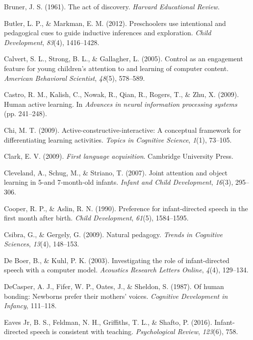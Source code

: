 \documentclass[a4paper,man,apacite,floatsintext]{apa6}
\begin{document}
\hypertarget{ref-bruner1961act}{}
Bruner, J. S. (1961). The act of discovery. \emph{Harvard Educational
Review}.

\hypertarget{ref-butler2012preschoolers}{}
Butler, L. P., \& Markman, E. M. (2012). Preschoolers use intentional
and pedagogical cues to guide inductive inferences and exploration.
\emph{Child Development}, \emph{83}(4), 1416--1428.

\hypertarget{ref-calvert2005control}{}
Calvert, S. L., Strong, B. L., \& Gallagher, L. (2005). Control as an
engagement feature for young children's attention to and learning of
computer content. \emph{American Behavioral Scientist}, \emph{48}(5),
578--589.

\hypertarget{ref-castro2009human}{}
Castro, R. M., Kalish, C., Nowak, R., Qian, R., Rogers, T., \& Zhu, X.
(2009). Human active learning. In \emph{Advances in neural information
processing systems} (pp. 241--248).

\hypertarget{ref-chi2009active}{}
Chi, M. T. (2009). Active-constructive-interactive: A conceptual
framework for differentiating learning activities. \emph{Topics in
Cognitive Science}, \emph{1}(1), 73--105.

\hypertarget{ref-clark2009first}{}
Clark, E. V. (2009). \emph{First language acquisition}. Cambridge
University Press.

\hypertarget{ref-cleveland2007joint}{}
Cleveland, A., Schug, M., \& Striano, T. (2007). Joint attention and
object learning in 5-and 7-month-old infants. \emph{Infant and Child
Development}, \emph{16}(3), 295--306.

\hypertarget{ref-cooper1990preference}{}
Cooper, R. P., \& Aslin, R. N. (1990). Preference for infant-directed
speech in the first month after birth. \emph{Child Development},
\emph{61}(5), 1584--1595.

\hypertarget{ref-csibra2009natural}{}
Csibra, G., \& Gergely, G. (2009). Natural pedagogy. \emph{Trends in
Cognitive Sciences}, \emph{13}(4), 148--153.

\hypertarget{ref-de2003investigating}{}
De Boer, B., \& Kuhl, P. K. (2003). Investigating the role of
infant-directed speech with a computer model. \emph{Acoustics Research
Letters Online}, \emph{4}(4), 129--134.

\hypertarget{ref-decasper1987human}{}
DeCasper, A. J., Fifer, W. P., Oates, J., \& Sheldon, S. (1987). Of
human bonding: Newborns prefer their mothers' voices. \emph{Cognitive
Development in Infancy}, 111--118.

\hypertarget{ref-eaves2016infant}{}
Eaves Jr, B. S., Feldman, N. H., Griffiths, T. L., \& Shafto, P. (2016).
Infant-directed speech is consistent with teaching. \emph{Psychological
Review}, \emph{123}(6), 758.
\end{document}
